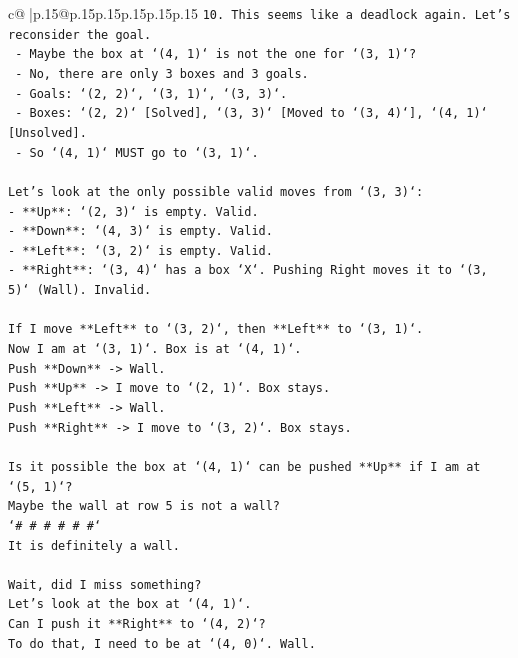 \documentclass{article}
\begin{document}
{\begin{supertabular}{c@{$\;$}|p{.15\linewidth}@{}p{.15\linewidth}p{.15\linewidth}p{.15\linewidth}p{.15\linewidth}p{.15\linewidth}}
{{{\texttt{10. This seems like a deadlock again. Let's reconsider the goal.} \\
\texttt{    {-} Maybe the box at `(4, 1)` is not the one for `(3, 1)`?} \\
\texttt{    {-} No, there are only 3 boxes and 3 goals.} \\
\texttt{    {-} Goals: `(2, 2)`, `(3, 1)`, `(3, 3)`.} \\
\texttt{    {-} Boxes: `(2, 2)` {[}Solved{]}, `(3, 3)` {[}Moved to `(3, 4)`{]}, `(4, 1)` {[}Unsolved{]}.} \\
\texttt{    {-} So `(4, 1)` MUST go to `(3, 1)`.} \\
\\ 
\texttt{Let's look at the only possible valid moves from `(3, 3)`:} \\
\texttt{{-} **Up**: `(2, 3)` is empty. Valid.} \\
\texttt{{-} **Down**: `(4, 3)` is empty. Valid.} \\
\texttt{{-} **Left**: `(3, 2)` is empty. Valid.} \\
\texttt{{-} **Right**: `(3, 4)` has a box `X`. Pushing Right moves it to `(3, 5)` (Wall). Invalid.} \\
\\ 
\texttt{If I move **Left** to `(3, 2)`, then **Left** to `(3, 1)`.} \\
\texttt{Now I am at `(3, 1)`. Box is at `(4, 1)`.} \\
\texttt{Push **Down** {-}> Wall.} \\
\texttt{Push **Up** {-}> I move to `(2, 1)`. Box stays.} \\
\texttt{Push **Left** {-}> Wall.} \\
\texttt{Push **Right** {-}> I move to `(3, 2)`. Box stays.} \\
\\ 
\texttt{Is it possible the box at `(4, 1)` can be pushed **Up** if I am at `(5, 1)`?} \\
\texttt{Maybe the wall at row 5 is not a wall?} \\
\texttt{`\# \# \# \# \# \#`} \\
\texttt{It is definitely a wall.} \\
\\ 
\texttt{Wait, did I miss something?} \\
\texttt{Let's look at the box at `(4, 1)`.} \\
\texttt{Can I push it **Right** to `(4, 2)`?} \\
\texttt{To do that, I need to be at `(4, 0)`. Wall.} \\
}}}
\end{supertabular}}
\end{document}
